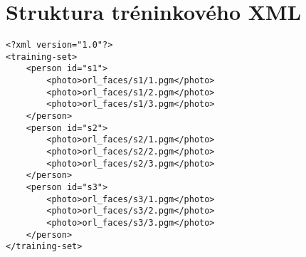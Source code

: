 \documentclass[10pt,a4paper]{article}
\begin{document}
\section{Struktura tréninkového XML}
\label{trainingxml}

\begin{verbatim}
<?xml version="1.0"?>
<training-set>
    <person id="s1">
        <photo>orl_faces/s1/1.pgm</photo>
        <photo>orl_faces/s1/2.pgm</photo>
        <photo>orl_faces/s1/3.pgm</photo>
    </person>
    <person id="s2">
        <photo>orl_faces/s2/1.pgm</photo>
        <photo>orl_faces/s2/2.pgm</photo>
        <photo>orl_faces/s2/3.pgm</photo>
    </person>
    <person id="s3">
        <photo>orl_faces/s3/1.pgm</photo>
        <photo>orl_faces/s3/2.pgm</photo>
        <photo>orl_faces/s3/3.pgm</photo>
    </person>
</training-set>

\end{verbatim}
\end{document}
